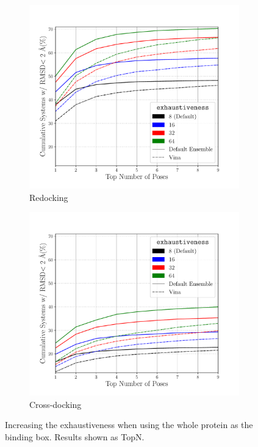 \documentclass[journal=jcisd8,manuscript=article]{achemso}
\begin{document}
\begin{figure}    
        \begin{subfigure}[b]{0.48\textwidth}    
    		\centering
    		\includegraphics[width=\textwidth]{figures/redocking/whole_ptn_sweep_exhaustiveness_line.pdf}
    		\caption{Redocking}
            \label{fig:WholeProteinExhRD}
        \end{subfigure}    
        \begin{subfigure}[b]{0.48\textwidth}    
    		\centering
    		\includegraphics[width=\textwidth]{figures/crossdocking/whole_ptn_sweep_exhaustiveness_line.pdf}
    		\caption{Cross-docking}
            \label{fig:WholeProteinExhCD}
        \end{subfigure}    
	\caption{Increasing the exhaustiveness when using the whole protein as the binding box. Results shown as TopN.}
        \label{fig:WholeProteinExh}
\end{figure}
\end{document}
